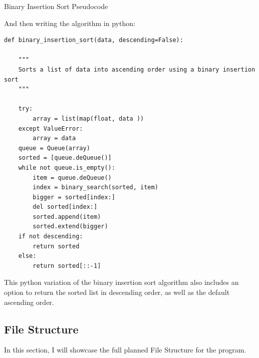 \documentclass[12pt]{article}
\begin{document}
\begin{algorithm}[ht]
    \caption{Binary Insertion Sort Pseudocode}
    \begin{algorithmic} [1]
            \EndWhile
        \EndFunction
    \end{algorithmic}
\end{algorithm}

And then writing the algorithm in python:

\begin{lstlisting}
def binary_insertion_sort(data, descending=False):

    """
    Sorts a list of data into ascending order using a binary insertion sort
    """

    try:
        array = list(map(float, data ))
    except ValueError:
        array = data
    queue = Queue(array)
    sorted = [queue.deQueue()]
    while not queue.is_empty():
        item = queue.deQueue()
        index = binary_search(sorted, item)
        bigger = sorted[index:]
        del sorted[index:]
        sorted.append(item)
        sorted.extend(bigger)
    if not descending:
        return sorted
    else:
        return sorted[::-1]
\end{lstlisting}

This python variation of the binary insertion sort algorithm also includes an option to return the sorted list in descending order, as well as the default ascending order.

\clearpage

\subsection{File Structure}

In this section, I will showcase the full planned File Structure for the program.
\end{document}
